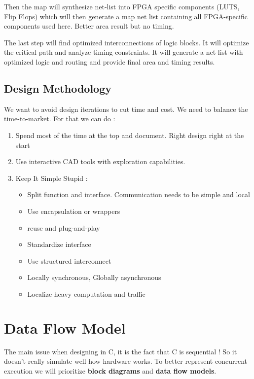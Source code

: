 \documentclass{report}
\begin{document}
Then the map will synthesize net-list into FPGA specific components (LUTS, Flip Flops) which will then generate a map net list containing all FPGA-specific components used here. Better area result but no timing.

The last step will find optimized interconnections of logic blocks. It will optimize the critical path and analyze timing constraints. It will generate a net-list with optimized logic and routing and provide final area and timing results.

\subsection{Design Methodology}

We want to avoid design iterations to cut time and cost. We need to balance the time-to-market. For that we can do : 
\begin{enumerate}
    \item Spend most of the time at the top and document. Right design right at the start
    \item Use interactive CAD tools with exploration capabilities.
    \item Keep It Simple Stupid : 
    \begin{itemize}
        \item Split function and interface. Communication needs to be simple and local
        \item Use encapsulation or wrappers
        \item reuse and plug-and-play
        \item Standardize interface
        \item Use structured interconnect
        \item Locally synchronous, Globally asynchronous
        \item Localize heavy computation and traffic
    \end{itemize}
\end{enumerate}

\section{Data Flow Model} \label{DFG}

The main issue when designing in C, it is the fact that C is sequential ! So it doesn't really simulate well how hardware works. To better represent concurrent execution we will prioritize \textbf{block diagrams} and \textbf{data flow models}.
\end{document}
